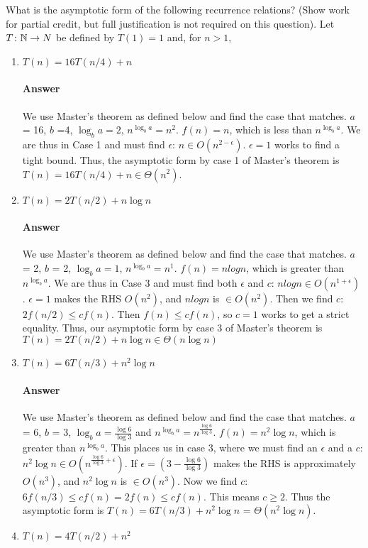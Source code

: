\documentclass{article}
\begin{document}
What is the asymptotic form of the following recurrence
relations? (Show work for partial credit, but full justification is not required
on this question).
Let $T \colon {\mathbb N} \to N$ be defined by $T(1)=1$ and, for $n>1$,
\begin{enumerate}
    \item $T(n) = 16 T(n/4) + n$
        \paragraph{Answer}{We use Master's theorem as defined below and find the case that matches. $a$ = 16, $b$ =4, ${\log_b a} = 2$, $n^{\log_b a} = n^2$. $f(n) = n$, which is less than $n^{\log_b a}$. We are thus in Case 1 and must find $\epsilon$: $n \in O(n^{2-\epsilon})$. $\epsilon = 1$ works to find a tight bound. Thus, the asymptotic form by case 1 of Master's theorem is $T(n) = 16 T(n/4) + n \in \Theta(n^2)$.}
    \item $T(n) = 2 T(n/2) + n \log{n}$
        \paragraph{Answer}{We use Master's theorem as defined below and find the case that matches. $a$ = 2, $b$ = 2, ${\log_b a} = 1$, $n^{\log_b a} = n^1$. $f(n) = nlogn$, which is greater than $n^{\log_b a}$. We are thus in Case 3 and must find both $\epsilon$ and $c$: $nlogn \in O(n^{1+\epsilon})$. $\epsilon = 1$ makes the RHS $O(n^2)$, and $nlogn$ is $\in O(n^2)$. Then we find $c$: $2f(n/2) \leq cf(n)$. Then $f(n) \leq cf(n)$, so $c = 1$ works to get a strict equality. Thus, our asymptotic form by case 3 of Master's theorem is $T(n) = 2 T(n/2) + n \log{n} \in \Theta(n \log{n})$}
    \item $T(n) = 6 T(n/3) + n^2 \log{n}$
        \paragraph{Answer}{We use Master's theorem as defined below and find the case that matches. $a$ = 6, $b$ = 3, ${\log_b a} = \frac{\log 6}{\log 3}$ and $n^{\log_b a} = n^{\frac{\log 6}{\log 3}}$. $f(n) = n^2{\log n}$, which is greater than $n^{\log_b a}$. This places us in case 3, where we must find an $\epsilon$ and a $c$: $n^2{\log n} \in O(n^{\frac{\log 6}{\log 3}+\epsilon})$. If $\epsilon = (3 - \frac{\log 6}{\log 3})$ makes the RHS is approximately $O(n^3)$, and $n^2{\log n}$ is $\in O(n^3)$. Now we find $c$: $6f(n/3) \leq cf(n) = 2f(n) \leq cf(n)$. This means $c \geq 2$. Thus the asymptotic form is  $T(n) = 6 T(n/3) + n^2 \log{n}$ = $\Theta(n^2{\log n}).$ }
    \item $T(n) = 4 T(n/2) + n^2$

\end{enumerate}
\end{document}
